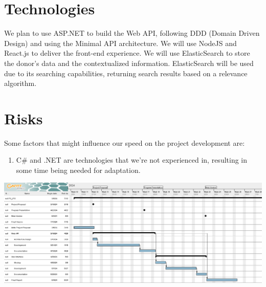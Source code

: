 \documentclass[a4paper,twoside,11pt]{article}
\begin{document}
\section{Technologies}
We plan to use ASP.NET to build the Web API, following DDD (Domain Driven Design) and using the Minimal API architecture. We will use NodeJS and React.js to deliver the front-end experience. We will use ElasticSearch to store the donor’s data and the contextualized information. ElasticSearch will be used due to its searching capabilities, returning search results based on a relevance algorithm.

\section{Risks}
Some factors that might influence our speed on the project development are:
\begin{enumerate}
	\item C\# and .NET are technologies that we’re not experienced in, resulting in some time being needed for adaptation.
\end{enumerate}

\includegraphics[width=15cm]{gantt.png}



\end{document}
